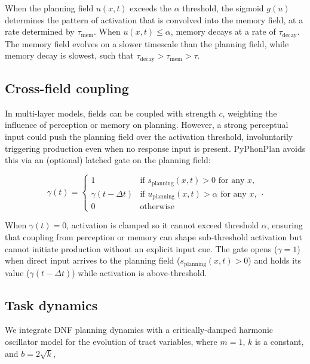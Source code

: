 \documentclass[cameraready]{Interspeech}
\begin{document}
When the planning field  $u(x,t)$ exceeds the $\alpha$ threshold, the sigmoid $g(u)$ determines the pattern of activation that is convolved into the memory field, at a rate determined by $\tau_{\text{mem}}$. When $u(x,t) \leq \alpha$, memory decays at a rate of $\tau_{\text{decay}}$. The memory field evolves on a slower timescale  than the planning field, while memory decay is slowest, such that $\tau_{\text{decay}} > \tau_{\text{mem}} > \tau$.





\subsection{Cross-field coupling}
\label{coupling}

In multi-layer models, fields can be coupled with strength $c$, weighting the influence of perception or memory on planning. However, a strong perceptual input could push the planning field over the activation threshold, involuntarily triggering production even when no response input is present. PyPhonPlan avoids this via an (optional) latched gate on the planning field:

\begin{equation}
\gamma(t) =
\begin{cases}
    1 & \text{if } s_{\text{planning}}(x, t) > 0 \text{ for any } x, \\
    \gamma(t - \Delta t) & \text{if } u_{\text{planning}}(x, t) > \alpha \text{ for any } x, \\
    0 & \text{otherwise}
\end{cases}.
\label{eq:gating}
\end{equation}

When $\gamma(t) = 0$, activation is clamped so it cannot exceed threshold $\alpha$, ensuring that coupling from perception or memory can shape sub-threshold activation but cannot initiate production without an explicit input cue. The gate opens ($\gamma = 1$) when direct input arrives to the planning field ($s_{\text{planning}}(x, t) > 0$) and holds its value ($\gamma(t - \Delta t)$) while activation is above-threshold.
  
\subsection{Task dynamics}

We integrate DNF planning dynamics with a critically-damped harmonic oscillator model \cite{saltzman-munhall1989} for the evolution of tract variables, where $m = 1$, $k$ is a constant, and $b = 2\sqrt k$,
\end{document}
